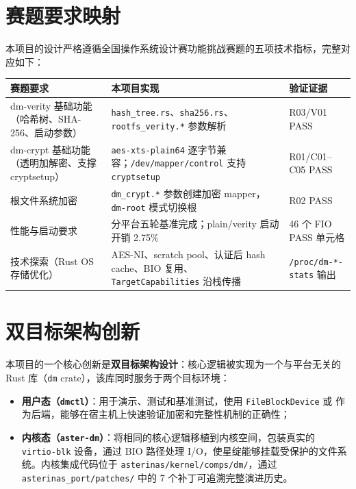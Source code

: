 \section{赛题要求映射}

本项目的设计严格遵循全国操作系统设计赛功能挑战赛题的五项技术指标，完整对应如下：

\begin{table}[H]
    \centering
    \begin{tabular}{p{}p{}p{}}
        \toprule
        \textbf{赛题要求} & \textbf{本项目实现} & \textbf{验证证据} \\
        \midrule
        dm-verity 基础功能（哈希树、SHA-256、启动参数） & \texttt{hash\_tree.rs}、\texttt{sha256.rs}、\texttt{rootfs\_verity.*} 参数解析 & R03/V01 PASS \\
        dm-crypt 基础功能（透明加解密、支撑 cryptsetup） & \texttt{aes-xts-plain64} 逐字节兼容；\texttt{/dev/mapper/control} 支持 \texttt{cryptsetup} & R01/C01--C05 PASS \\
        根文件系统加密 & \texttt{dm\_crypt.*} 参数创建加密 mapper，\texttt{dm-root} 模式切换根 & R02 PASS \\
        性能与启动要求 & 分平台五轮基准完成；plain/verity 启动开销 2.75\% & 46 个 FIO PASS 单元格 \\
        技术探索（Rust OS 存储优化） & AES-NI、scratch pool、认证后 hash cache、BIO 复用、\texttt{TargetCapabilities} 沿栈传播 & \texttt{/proc/dm-*-stats} 输出 \\
        \bottomrule
    \end{tabular}
\end{table}

\section{双目标架构创新}

本项目的一个核心创新是\textbf{双目标架构设计}：核心逻辑被实现为一个与平台无关的 Rust 库（\texttt{dm} crate），该库同时服务于两个目标环境：

\begin{itemize}
    \item \textbf{用户态（\texttt{dmctl}）}：用于演示、测试和基准测试，使用 \texttt{FileBlockDevice} 或 \texttt{} 作为后端，能够在宿主机上快速验证加密和完整性机制的正确性；
    \item \textbf{内核态（\texttt{aster-dm}）}：将相同的核心逻辑移植到内核空间，包装真实的 \texttt{virtio-blk} 设备，通过 BIO 路径处理 I/O，使星绽能够挂载受保护的文件系统。内核集成代码位于 \texttt{asterinas/kernel/comps/dm/}，通过 \texttt{asterinas\_port/patches/} 中的 7 个补丁可追溯完整演进历史。
\end{itemize}

